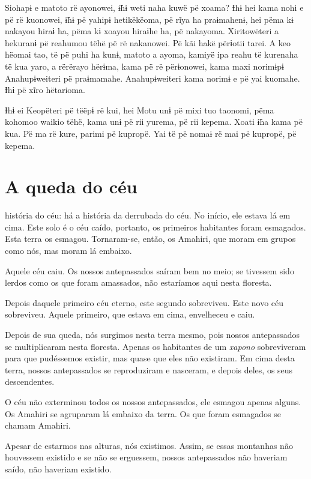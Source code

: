 Siohapɨ e matoto rë ayonowei, ɨ̃hɨ weti naha kuwë pë xoama? Ɨhɨ hei kama
nohi e pë rë kuonowei, ɨ̃hɨ pë yahipɨ hetikëkëoma, pë rĩya ha praɨmahenɨ,
hei pëma kɨ nakayou hiraɨ ha, pëma kɨ xoayou hiraɨhe ha, pë nakayoma.
Xiritowëteri a hekuranɨ pë reahumou tëhë pë rë nakanowei. Pë kãi hakë
përɨotii tarei. A keo hëomai tao, të pë puhi ha kunɨ, matoto a ayoma,
kamiyë ipa reahu të kurenaha të kua yaro, a rërërayo hërɨma, kama pë rë
përɨonowei, kama maxi norimɨpɨ Anahupɨweiteri pë praɨmamahe.
Anahupɨweiteri kama norimɨ e pë yai kuomahe. Ɨhɨ pë xĩro hëtarioma. 

Ɨhɨ ei Keopëteri pë tëëpɨ rë kui, hei Motu unɨ pë mixi tuo taonomi, pëma
kohomoo waikio tëhë, kama unɨ pë rii yurema, pë rii kepema. Xoati ɨ̃ha
kama pë kua. Pë ma rë kure, parimi pë kupropë. Yai të pë nomaɨ rë mai pë
kupropë, pë kepema. 

\chapter{A queda do céu}

história do céu: há a história da derrubada do céu. No início, ele
estava lá em cima. Este solo é o céu caído, portanto, os primeiros
habitantes foram esmagados. Esta terra os esmagou. Tornaram-se, então,
os Amahiri, que moram em grupos como nós, mas moram lá embaixo.

Aquele céu caiu. Os nossos antepassados saíram bem no meio; se tivessem
 sido lerdos como os que foram amassados, não estaríamos aqui nesta
 floresta. 

Depois daquele primeiro céu eterno, este segundo sobreviveu. Este novo
céu sobreviveu. Aquele primeiro, que estava em cima, envelheceu e caiu. 

Depois de sua queda, nós surgimos nesta terra mesmo, pois nossos
 antepassados se multiplicaram nesta floresta. Apenas os habitantes de um
 \textit{xapono} sobreviveram para que pudéssemos existir, mas quase que eles não
 existiram. Em cima desta terra, nossos antepassados se reproduziram e
 nasceram, e depois deles, os seus descendentes. 

O céu não exterminou todos os nossos antepassados, ele esmagou apenas alguns. Os
Amahiri se agruparam lá embaixo da terra. Os que foram esmagados se
chamam Amahiri. 

Apesar de estarmos nas alturas, nós existimos. Assim, se essas montanhas
não houvessem existido e se não se erguessem, nossos antepassados não
haveriam saído, não haveriam existido.


